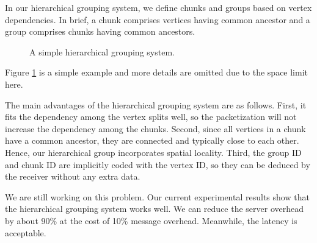 \documentclass{sig-alt-release2}
\begin{document}
    In our hierarchical grouping system, 
    we define chunks and groups based on vertex dependencies. In brief, 
    a chunk comprises vertices having common ancestor and a group comprises
    chunks having common ancestors.   
    \begin{figure}[t]
    \centering
    \caption{A simple hierarchical grouping system.
    \label{packetize}}
    \end{figure}
    Figure \ref{packetize} is a simple example and more details are omitted 
    due to the space limit here.    
    
    The main advantages of the hierarchical grouping system are as follows.
    First, it fits the dependency among the vertex splits
    well, so the packetization will not increase the dependency
    among the chunks.
    Second, since all vertices in a chunk have a common ancestor, 
    they are connected and typically close to each other.
    Hence, our hierarchical group
    incorporates spatial locality. 
    Third, the group ID and chunk ID are implicitly
    coded with the vertex ID, so they can be deduced by the receiver without any extra data.

    We are still working on this problem. %
    Our current experimental results show that the hierarchical grouping system works well.
    We can reduce the server 
    overhead by about 90\% at the cost of 10\% message overhead. Meanwhile, the latency is
    acceptable. 
\end{document}
